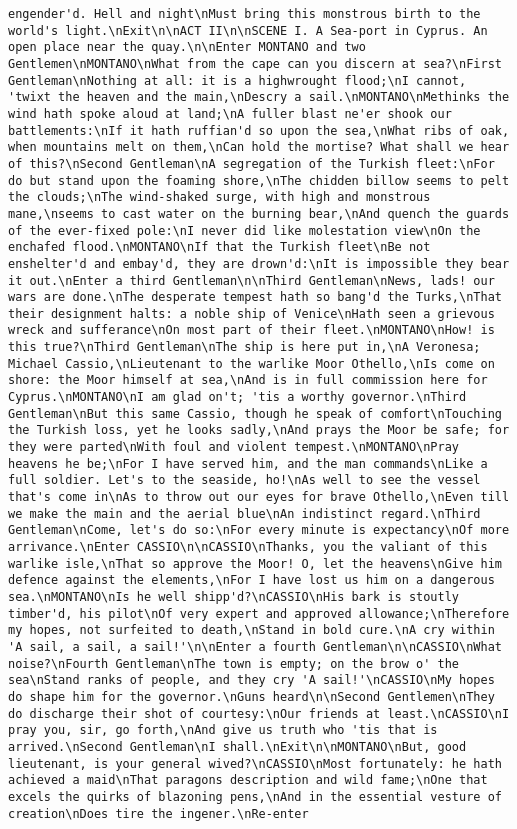 \begin{verbatim}
engender'd. Hell and night\nMust bring this monstrous birth to the world's light.\nExit\n\nACT II\n\nSCENE I. A Sea-port in Cyprus. An open place near the quay.\n\nEnter MONTANO and two Gentlemen\nMONTANO\nWhat from the cape can you discern at sea?\nFirst Gentleman\nNothing at all: it is a highwrought flood;\nI cannot, 'twixt the heaven and the main,\nDescry a sail.\nMONTANO\nMethinks the wind hath spoke aloud at land;\nA fuller blast ne'er shook our battlements:\nIf it hath ruffian'd so upon the sea,\nWhat ribs of oak, when mountains melt on them,\nCan hold the mortise? What shall we hear of this?\nSecond Gentleman\nA segregation of the Turkish fleet:\nFor do but stand upon the foaming shore,\nThe chidden billow seems to pelt the clouds;\nThe wind-shaked surge, with high and monstrous mane,\nseems to cast water on the burning bear,\nAnd quench the guards of the ever-fixed pole:\nI never did like molestation view\nOn the enchafed flood.\nMONTANO\nIf that the Turkish fleet\nBe not enshelter'd and embay'd, they are drown'd:\nIt is impossible they bear it out.\nEnter a third Gentleman\n\nThird Gentleman\nNews, lads! our wars are done.\nThe desperate tempest hath so bang'd the Turks,\nThat their designment halts: a noble ship of Venice\nHath seen a grievous wreck and sufferance\nOn most part of their fleet.\nMONTANO\nHow! is this true?\nThird Gentleman\nThe ship is here put in,\nA Veronesa; Michael Cassio,\nLieutenant to the warlike Moor Othello,\nIs come on shore: the Moor himself at sea,\nAnd is in full commission here for Cyprus.\nMONTANO\nI am glad on't; 'tis a worthy governor.\nThird Gentleman\nBut this same Cassio, though he speak of comfort\nTouching the Turkish loss, yet he looks sadly,\nAnd prays the Moor be safe; for they were parted\nWith foul and violent tempest.\nMONTANO\nPray heavens he be;\nFor I have served him, and the man commands\nLike a full soldier. Let's to the seaside, ho!\nAs well to see the vessel that's come in\nAs to throw out our eyes for brave Othello,\nEven till we make the main and the aerial blue\nAn indistinct regard.\nThird Gentleman\nCome, let's do so:\nFor every minute is expectancy\nOf more arrivance.\nEnter CASSIO\n\nCASSIO\nThanks, you the valiant of this warlike isle,\nThat so approve the Moor! O, let the heavens\nGive him defence against the elements,\nFor I have lost us him on a dangerous sea.\nMONTANO\nIs he well shipp'd?\nCASSIO\nHis bark is stoutly timber'd, his pilot\nOf very expert and approved allowance;\nTherefore my hopes, not surfeited to death,\nStand in bold cure.\nA cry within 'A sail, a sail, a sail!'\n\nEnter a fourth Gentleman\n\nCASSIO\nWhat noise?\nFourth Gentleman\nThe town is empty; on the brow o' the sea\nStand ranks of people, and they cry 'A sail!'\nCASSIO\nMy hopes do shape him for the governor.\nGuns heard\n\nSecond Gentlemen\nThey do discharge their shot of courtesy:\nOur friends at least.\nCASSIO\nI pray you, sir, go forth,\nAnd give us truth who 'tis that is arrived.\nSecond Gentleman\nI shall.\nExit\n\nMONTANO\nBut, good lieutenant, is your general wived?\nCASSIO\nMost fortunately: he hath achieved a maid\nThat paragons description and wild fame;\nOne that excels the quirks of blazoning pens,\nAnd in the essential vesture of creation\nDoes tire the ingener.\nRe-enter 
\end{verbatim}
